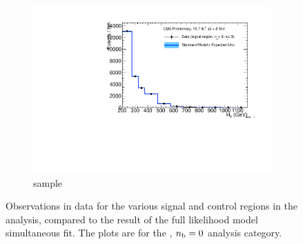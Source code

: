 \begin{figure}[h!]
\begin{subfigure}[b]{0.48\textwidth}
    \includegraphics[width=\textwidth,page=6]
    {Figs/results/v0/blueBand/bestFit_2012dev_RQcdZero_fZinvAll_0b_le3j-12hp_smOnly}
    \caption{\gj sample}
  \end{subfigure}
  \caption{Observations in data for the various signal and control
  regions in the analysis, compared to the result of the full likelihood model
  simultaneous fit. The plots are for the \njlow, $n_{\text{b}} = 0$ analysis category.}
  \label{fig:blue_fits_0b_le3j}
\end{figure}

